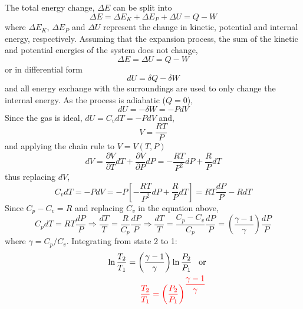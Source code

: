 \documentclass[12pts,a4paper,amsmath,amssymb,floatfix]{article}%
\newcommand{\frc}{\displaystyle\frac}
\begin{document}
\begin{enumerate}[label=\bfseries Example \arabic*:]
The total energy change, $\Delta E$ can be split into
\begin{displaymath}
\Delta E = \Delta E_{K} + \Delta E_{P} + \Delta U = Q - W
\end{displaymath}
where $\Delta E_{K}$, $\Delta E_{P}$ and $\Delta U$ represent the change in kinetic, potential and internal energy, respectively. Assuming that the expansion process, the sum of the kinetic and potential energies of the system does not change,
\begin{displaymath}
\Delta E = \Delta U = Q - W
\end{displaymath}
or in differential form
\begin{displaymath}
dU = \delta Q - \delta W
\end{displaymath}
and all energy exchange with the surroundings are used to only change the internal energy. As the process is adiabatic ($Q=0$),
\begin{displaymath}
 dU = -\delta W = -P dV
\end{displaymath}
Since the gas is ideal, $dU=C_{v}dT = -PdV$ and,
\begin{displaymath}
V=\frc{RT}{P}
\end{displaymath}
and applying the chain rule to $V=V(T,P)$
\begin{displaymath}
dV = \frc{\partial V}{\partial T}dT + \frc{\partial V}{\partial P}dP= -\frc{RT}{P^{2}}dP + \frac{R}{P}dT
\end{displaymath}
 thus replacing $dV$,
\begin{displaymath}
C_{v}dT = - PdV = -P\left[-\frc{RT}{P^{2}}dP + \frc{R}{P}dT\right] = RT\frc{dP}{P} - RdT
\end{displaymath}
Since $C_{p}-C_{v}=R$ and replacing $C_{v}$ in the equation above,
\begin{displaymath}
C_{p}dT = RT\frc{dP}{P} \Longrightarrow \frc{dT}{T} = \frc{R}{C_{p}}\frc{dP}{P} \Longrightarrow \frc{dT}{T} = \frc{C_{p}-C_{v}}{C_{p}}\frc{dP}{P}=\left(\frc{\gamma - 1}{\gamma}\right)\frc{dP}{P}
\end{displaymath}
where $\gamma = C_{p}/C_{v}$. Integrating from state 2 to 1:
\begin{eqnarray}
&& \ln\frc{T_{2}}{T_{1}}=\left(\frc{\gamma - 1 }{\gamma}\right)\ln\frc{P_{2}}{P_{1}} \;\;\; \text{or} \nonumber \\
&& \textcolor{red}{\frc{T_{2}}{T_{1}} = \left(\frc{P_{2}}{P_{1}}\right)^{\frc{\gamma-1}{\gamma}}} \nonumber 
\end{eqnarray}

\medskip


\end{enumerate}
\end{document}
